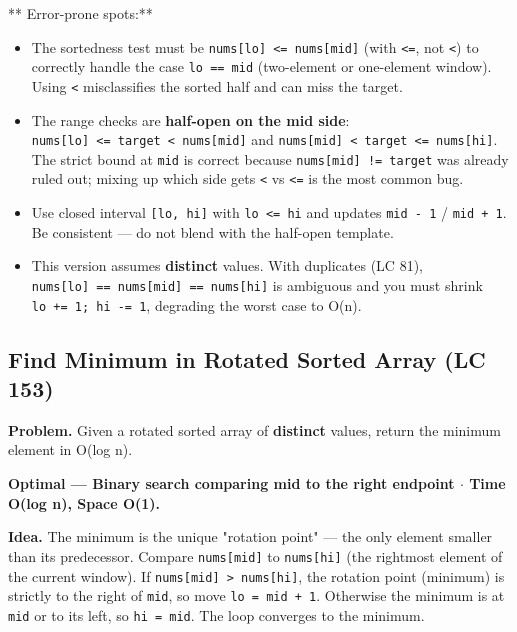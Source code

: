 \documentclass[11pt]{article}
\providecommand{\tightlist}{\setlength{\itemsep}{1pt}\setlength{\parskip}{0pt}}
\begin{document}
** Error-prone spots:**

\begin{itemize}
\tightlist
\item
  The sortedness test must be \texttt{nums{[}lo{]}\ \textless{}=\ nums{[}mid{]}} (with \texttt{\textless{}=}, not \texttt{\textless{}}) to correctly handle the case \texttt{lo\ ==\ mid} (two-element or one-element window). Using \texttt{\textless{}} misclassifies the sorted half and can miss the target.
\item
  The range checks are \textbf{half-open on the mid side}: \texttt{nums{[}lo{]}\ \textless{}=\ target\ \textless{}\ nums{[}mid{]}} and \texttt{nums{[}mid{]}\ \textless{}\ target\ \textless{}=\ nums{[}hi{]}}. The strict bound at \texttt{mid} is correct because \texttt{nums{[}mid{]}\ !=\ target} was already ruled out; mixing up which side gets \texttt{\textless{}} vs \texttt{\textless{}=} is the most common bug.
\item
  Use closed interval \texttt{{[}lo,\ hi{]}} with \texttt{lo\ \textless{}=\ hi} and updates \texttt{mid\ -\ 1} / \texttt{mid\ +\ 1}. Be consistent --- do not blend with the half-open template.
\item
  This version assumes \textbf{distinct} values. With duplicates (LC 81), \texttt{nums{[}lo{]}\ ==\ nums{[}mid{]}\ ==\ nums{[}hi{]}} is ambiguous and you must shrink \texttt{lo\ +=\ 1;\ hi\ -=\ 1}, degrading the worst case to O(n).
\end{itemize}

\subsection{Find Minimum in Rotated Sorted Array (LC 153)}\label{find-minimum-in-rotated-sorted-array-lc-153}

\textbf{Problem.} Given a rotated sorted array of \textbf{distinct} values, return the minimum element in O(log n).

\textbf{Optimal --- Binary search comparing mid to the right endpoint \(\cdot\) Time O(log n), Space O(1).}

\textbf{Idea.} The minimum is the unique "rotation point" --- the only element smaller than its predecessor. Compare \texttt{nums{[}mid{]}} to \texttt{nums{[}hi{]}} (the rightmost element of the current window). If \texttt{nums{[}mid{]}\ \textgreater{}\ nums{[}hi{]}}, the rotation point (minimum) is strictly to the right of \texttt{mid}, so move \texttt{lo\ =\ mid\ +\ 1}. Otherwise the minimum is at \texttt{mid} or to its left, so \texttt{hi\ =\ mid}. The loop converges to the minimum.
\end{document}
